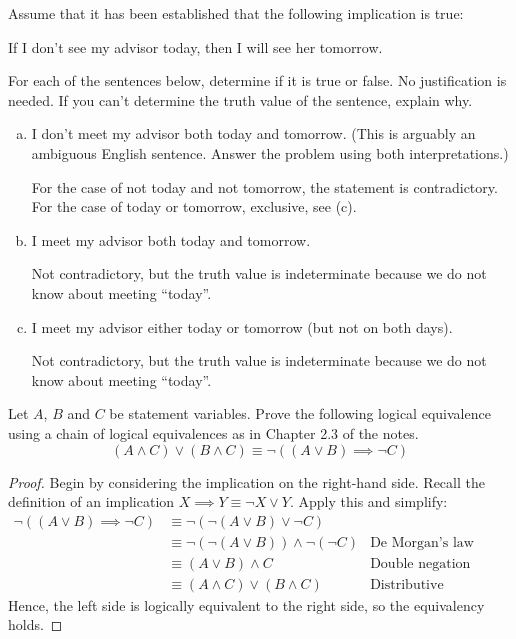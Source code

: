\documentclass{agony}
\begin{document}
\question Assume that it has been established that the following implication is true:
\begin{center}
  If I don’t see my advisor today, then I will see her tomorrow.
\end{center}
For each of the sentences below, determine if it is true or false. No justification is needed.
If you can’t determine the truth value of the sentence, explain why.
\begin{enumerate}[(a)]
  \item I don’t meet my advisor both today and tomorrow. (This is arguably an ambiguous English sentence. Answer the problem using both interpretations.)

        For the case of not today and not tomorrow, the statement is contradictory.
        For the case of today or tomorrow, exclusive, see (c).

  \item I meet my advisor both today and tomorrow.

        Not contradictory, but the truth value is indeterminate because we do not know about meeting ``today''.

  \item I meet my advisor either today or tomorrow (but not on both days).

        Not contradictory, but the truth value is indeterminate because we do not know about meeting ``today''.
\end{enumerate}


\question Let $A$, $B$ and $C$ be statement variables.
Prove the following logical equivalence using a chain of logical equivalences as in Chapter 2.3 of the notes.
\begin{equation*}
  (A \land C) \lor (B \land C) \equiv \lnot((A \lor B) \implies \lnot C)
\end{equation*}

\begin{proof}
  Begin by considering the implication on the right-hand side.
  Recall the definition of an implication $X \implies Y \equiv \lnot X \lor Y$.
  Apply this and simplify:
  \begin{align*}
    \lnot((A \lor B) \implies \lnot C) & \equiv \lnot(\lnot (A \lor B) \lor \lnot C)                                           \\
                                       & \equiv \lnot(\lnot (A \lor B)) \land \lnot(\lnot C) & \text{De Morgan's law}          \\
                                       & \equiv (A \lor B) \land C                           & \text{Double negation}          \\
                                       & \equiv (A \land C) \lor (B \land C)                 & \text{Distributive conjunction}
  \end{align*}
  Hence, the left side is logically equivalent to the right side, so the equivalency holds.
\end{proof}
\end{document}
